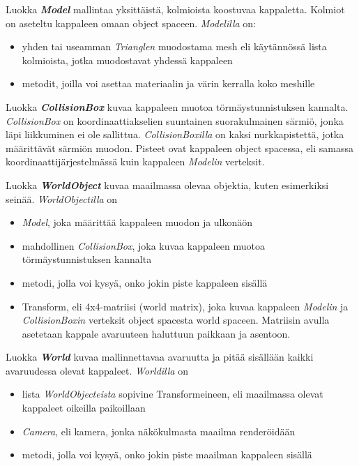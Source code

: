 \documentclass[12pt] {article}
\newcommand{\textbi}[1]{\textit{\textbf{#1}}}
\begin{document}
Luokka \textit{\textbf{Model}} mallintaa yksittäistä, kolmioista koostuvaa kappaletta. Kolmiot on aseteltu kappaleen omaan object spaceen. \textit{Modelilla} on:
\begin{itemize}
	\item yhden tai useamman \textit{Trianglen} muodostama mesh eli käytännössä lista kolmioista, jotka muodostavat yhdessä kappaleen
	\item metodit, joilla voi asettaa materiaalin ja värin kerralla koko meshille
\end{itemize}

Luokka \textbi{CollisionBox} kuvaa kappaleen muotoa törmäystunnistuksen kannalta. \textit{CollisionBox} on koordinaattiakselien suuntainen suorakulmainen särmiö, jonka läpi liikkuminen ei ole sallittua. \textit{CollisionBoxilla} on kaksi nurkkapistettä, jotka määrittävät särmiön muodon. Pisteet ovat kappaleen object spacessa, eli samassa koordinaattijärjestelmässä kuin kappaleen \textit{Modelin} verteksit.

Luokka \textit{\textbf{WorldObject}} kuvaa maailmassa olevaa objektia, kuten esimerkiksi seinää. \textit{WorldObjectilla} on
\begin{itemize}
	\item \textit{Model}, joka määrittää kappaleen muodon ja ulkonäön
	\item mahdollinen \textit{CollisionBox}, joka kuvaa kappaleen muotoa törmäystunnistuksen kannalta
	\item metodi, jolla voi kysyä, onko jokin piste kappaleen sisällä
	\item Transform, eli 4x4-matriisi (world matrix), joka kuvaa kappaleen \textit{Modelin} ja \textit{CollisionBoxin} verteksit object spacesta world spaceen. Matriisin avulla asetetaan kappale avaruuteen haluttuun paikkaan ja asentoon.
\end{itemize}

Luokka \textit{\textbf{World}} kuvaa mallinnettavaa avaruutta ja pitää sisällään kaikki avaruudessa olevat kappaleet. \textit{Worldilla} on
\begin{itemize}
	\item lista \textit{WorldObjecteista} sopivine Transformeineen, eli maailmassa olevat kappaleet oikeilla paikoillaan
	\item \textit{Camera}, eli kamera, jonka näkökulmasta maailma renderöidään
	\item metodi, jolla voi kysyä, onko jokin piste maailman kappaleen sisällä
\end{itemize}
\end{document}
